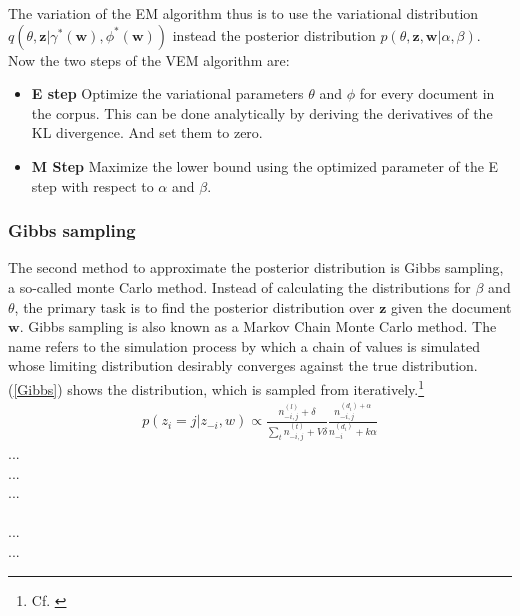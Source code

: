 \documentclass[11pt,a4paper]{article}
\begin{document}
The variation of the EM algorithm thus is to use the variational distribution $q(\theta,\textbf{z}|\gamma^*(\textbf{w}), \phi^*(\textbf{w}))$ instead the posterior distribution $p(\theta,\textbf{z},\textbf{w}|\alpha,\beta)$. Now the two steps of the VEM algorithm are:
\begin{itemize}
	\item [(1)]\textbf{E step} Optimize the variational parameters $\theta$ and $\phi$ for every document in the corpus. This can be done analytically by deriving the derivatives of the KL divergence. And set them to zero.
	\item [(2)] \textbf{M Step} Maximize the lower bound using the optimized parameter of the E step with respect to $\alpha$ and $\beta$.
\end{itemize}


\subsubsection{Gibbs sampling}

The second method to approximate the posterior distribution is Gibbs sampling, a so-called monte Carlo method. Instead of calculating the distributions for $\beta$ and $\theta$, the primary task is to find the posterior distribution over $\textbf{z}$ given the document $\textbf{w}$. Gibbs sampling is also known as a Markov Chain Monte Carlo method. The name refers to the simulation process by which a chain of values is simulated whose limiting distribution desirably converges against the true distribution. (\ref{Gibbs}) shows the distribution, which is sampled from iteratively.\footnote{Cf. \cite{Griffiths2006}}
\begin{align}\label{Gibbs}
	p(z_i=j|z_{-i},w)\propto \frac{n_{-i,j}^{(l)}+\delta}{\sum_t n_{-i,j}^{(t)}+V\delta}
	\frac{n_{-i,j}^{(d_i)+\alpha}}{n_{-i}^{(d_i)}+k\alpha}
\end{align}
	 		... \\
	   		... \\
		... \\
	\makebox[1cm][l]{}						\\
					... \\
	\makebox[1cm][l]{$\delta,\alpha$} 	... \\
\end{document}
